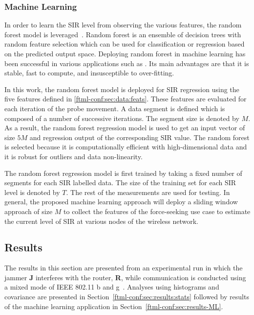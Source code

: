 \subsubsection{Machine Learning}\label{ftml-conf:sec:data:ML}
In order to learn the SIR level from observing the various features, the random forest model is leveraged~\cite{RF}. Random forest is an ensemble of decision trees with random feature selection which can be used for classification or regression based on the predicted output space. Deploying random forest in machine learning has been successful in various applications such as \cite{RF_1,RF_2,RF_3}. Its main advantages are that it is stable, fast to compute, and insusceptible to over-fitting.

In this work, the random forest model is deployed for SIR regression using the five features defined in \ref{ftml-conf:sec:data:feats}. These features are evaluated for each iteration of the probe movement. A data segment is defined which is composed of a number of successive iterations.  The segment size is denoted by $M$. As a result, the random forest regression model is used to get an input vector of size $5M$ and regression output of the corresponding SIR value. The random forest is selected because it is computationally efficient with high-dimensional data and it is robust for outliers and data non-linearity. 

The random forest regression model is first trained by taking a fixed number of segments for each SIR labelled data. The size of the training set for each SIR level is denoted by $T$. The rest of the measurements are used for testing. In general, the proposed machine learning approach will deploy a sliding window approach of size $M$ to collect the features of the force-seeking use case to estimate the current level of SIR at various nodes of the wireless network. 

\subsection{Results} \label{ftml-conf:sec:results}  

The results in this section are  presented from an experimental run in which the jammer \textbf{J} interferes with the router, \textbf{R}, while communication is conducted using a mixed mode of IEEE 802.11 b and g~\cite{IEEE802.11ac}.  Analyses using histograms and covariance are presented in Section~\ref{ftml-conf:sec:results:stats} followed by results of the machine learning application in Section~\ref{ftml-conf:sec:results-ML}.


